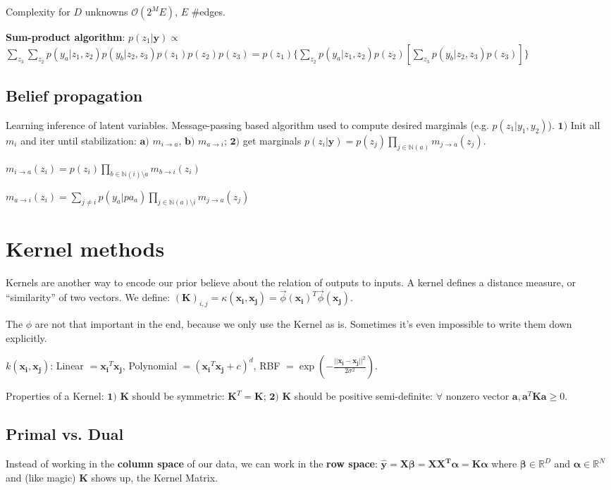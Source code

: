 \documentclass[10pt,a4paper,landscape]{extarticle}
\renewcommand{\bf}[1]{\ensuremath{\mathbf{#1}}}
\newcommand{\balpha}{\boldsymbol\alpha}
\newcommand{\bbeta}{\boldsymbol\beta}
\begin{document}
\begin{multicols*}{4}
Complexity for $D$ unknowns $\mathcal{O}(2^M E)$, $E$ \#edges.

\textbf{Sum-product algorithm}: $p(z_1 | \bf{y}) \propto$
$\sum_{z_3} \sum_{z_2} p(y_a|z_1,z_2) p(y_b | z_2, z_3) p(z_1) p(z_2) p(z_3
) = p(z_1) \{ \sum_{z_2} p(y_a | z_1, z_2) p(z_2) [ \sum_{z_3} p(y_b | z_2, z_3) p(z_3) ] \}$

\subsection{Belief propagation}
Learning inference of latent variables. Message-passing based algorithm used to compute desired marginals (e.g. $p(z_1 | y_1, y_2)$). $\bf{1)}$ Init all $m_i$ and iter until stabilization: $\bf{a)}$ $m_{i \rightarrow a}$, $\bf{b)}$ $m_{a \rightarrow i}$; $\bf{2)}$ get marginals $p(z_i | \bf{y}) = p(z_j) \prod_{j \in \mathbb{N} (a)} m_{j \rightarrow a} (z_j)$.

$m_{i \rightarrow a}(z_i) = p(z_i) \prod_{b \in \mathbb{N}(i) \setminus a} m_{b \rightarrow i}(z_i) $

$m_{a \rightarrow i}(z_i) = \sum_{j \neq i} p(y_a | pa_a) \prod_{j \in \mathbb{N}(a) \setminus i } m_{j \rightarrow a}(z_j)$


\section{Kernel methods}
Kernels are another way to encode our prior believe about the relation of outputs to inputs. A kernel defines a distance measure, or ``similarity'' of two vectors. We define:
$(\bf{K})_{i,j} = \kappa(\bf{x_i}, \bf{x_j}) = \vec \phi(\bf{x_i})^T \vec \phi(\bf{x_j})$.

The $\phi$ are not that important in the end, because we only use the Kernel as is. Sometimes it's even impossible to write them down explicitly.

$k(\bf{x_i}, \bf{x_j})$: Linear $= \bf{x_i}^T \bf{x_j}$, 
Polynomial $= (\bf{x_i}^T \bf{x_j} + c)^d$,
RBF $= \exp\left(-\frac{||\bf{x_i} - \bf{x_j}||^2}{2\sigma^2}\right)$.

Properties of a Kernel: $\bf{1)}$ $\bf{K}$ should be symmetric: $\bf{K}^T = \bf{K}$; $\bf{2)}$ $\bf{K}$ should be positive semi-definite: $\forall$ nonzero vector $\bf{a}, \bf{a}^T \bf{K} \bf{a} \geq 0$.

\subsection{Primal vs. Dual}
Instead of working in the \textbf{column space} of our data, we can work in the \textbf{row space}:
$\bf{\hat{y} = X \bbeta = X X^T \balpha = K \balpha}$
where $\bbeta \in \mathbb{R}^D$ and $\balpha \in \mathbb{R}^N$
and (like magic) $\bf{K}$ shows up, the Kernel Matrix.


\end{multicols*}
\end{document}
